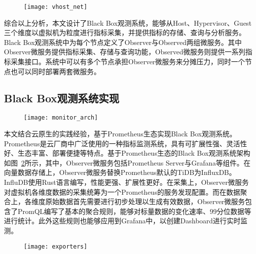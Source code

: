 \begin{figure}[!htbp]
    \centering
    \texttt{[image: vhost\_net]}
    \label{fig:vhost_net}
\end{figure}

综合以上分析，本文设计了Black Box观测系统，能够从Host、Hypervisor、Guest三个维度以虚拟机为粒度进行指标采集，并提供指标的存储、查询与分析服务。Black Box观测系统中为每个节点定义了Observer与Observed两组微服务。其中Observer微服务提供指标采集、存储与查询功能，Observed微服务则提供一系列指标采集接口。系统中可以有多个节点承担Observer微服务来分摊压力，同时一个节点也可以同时部署两套微服务。

\subsection{Black Box观测系统实现}


\begin{figure}[!htbp]
    \centering
    \texttt{[image: monitor\_arch]}
    \label{fig:monitor_arch}
\end{figure}

本文结合云原生的实践经验，基于Prometheus\citep{prometheus}生态实现Black Box观测系统。Prometheus是云厂商中广泛使用的一种指标监测系统，具有可扩展性强、灵活性好、生态丰富、部署便捷等特点。基于Prometheus生态的Black Box观测系统架构如图~\ref{fig:monitor_arch}所示，其中，Observer微服务包括Prometheus Server与Grafana等组件。在向量数据存储上，Observer微服务替换Prometheus默认的TiDB为InfluxDB。InfluDB使用Rust语言编写，性能更强、扩展性更好。在采集上，Observer微服务对虚拟机各维度数据的采集统筹为一个Prometheus的服务发现配置。而在数据聚合上，各维度原始数据首先需要进行初步处理以生成有效数据，Observer微服务包含了PromQL编写了基本的聚合规则，能够对标量数据的变化速率、99分位数据等进行统计。此外这些规则也能够应用到Grafana中，以创建Dashboard进行实时监测。

\begin{figure}[!htbp]
    \centering
    \texttt{[image: exporters]}
    \label{fig:exporters} 
\end{figure}

